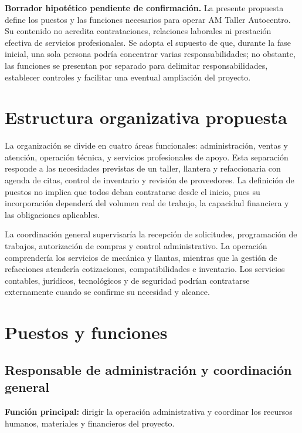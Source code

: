 \documentclass[12pt,letterpaper,oneside]{article}
\begin{document}
\textbf{Borrador hipotético pendiente de confirmación.} La presente propuesta define los puestos y las funciones necesarios para operar AM Taller Autocentro. Su contenido no acredita contrataciones, relaciones laborales ni prestación efectiva de servicios profesionales. Se adopta el supuesto de que, durante la fase inicial, una sola persona podría concentrar varias responsabilidades; no obstante, las funciones se presentan por separado para delimitar responsabilidades, establecer controles y facilitar una eventual ampliación del proyecto.

\section{Estructura organizativa propuesta}

La organización se divide en cuatro áreas funcionales: administración, ventas y atención, operación técnica, y servicios profesionales de apoyo. Esta separación responde a las necesidades previstas de un taller, llantera y refaccionaria con agenda de citas, control de inventario y revisión de proveedores. La definición de puestos no implica que todos deban contratarse desde el inicio, pues su incorporación dependerá del volumen real de trabajo, la capacidad financiera y las obligaciones aplicables.

La coordinación general supervisaría la recepción de solicitudes, programación de trabajos, autorización de compras y control administrativo. La operación comprendería los servicios de mecánica y llantas, mientras que la gestión de refacciones atendería cotizaciones, compatibilidades e inventario. Los servicios contables, jurídicos, tecnológicos y de seguridad podrían contratarse externamente cuando se confirme su necesidad y alcance.

\section{Puestos y funciones}

\subsection{Responsable de administración y coordinación general}

\textbf{Función principal:} dirigir la operación administrativa y coordinar los recursos humanos, materiales y financieros del proyecto.
\end{document}
